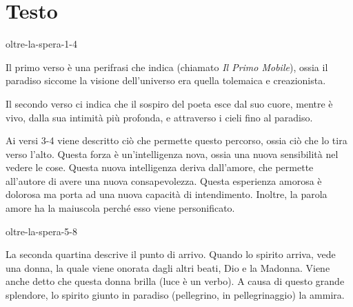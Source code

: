 \documentclass[preview]{standalone}
\begin{document}
\genpage

\section{Testo}


\begin{snippet}{oltre-la-spera-1-4}

    Il primo verso è una perifrasi che indica  (chiamato \textit{Il Primo Mobile}), ossia il paradiso
    siccome la visione dell'universo era quella tolemaica e creazionista.
    
    Il secondo verso ci indica che il sospiro del poeta esce dal suo cuore, mentre è vivo, dalla sua intimità più profonda,
    e attraverso i cieli fino al paradiso.  
    
    Ai versi 3-4 viene descritto ciò che permette questo percorso, ossia ciò che lo tira
    verso l'alto. Questa forza è un'intelligenza nova, ossia una nuova sensibilità nel vedere le cose.
    Questa nuova intelligenza deriva dall'amore, che permette all'autore di avere una nuova consapevolezza.
    Questa esperienza amorosa è dolorosa ma porta ad una nuova capacità di intendimento.
    Inoltre, la parola amore ha la maiuscola perché esso viene personificato.
\end{snippet}

\begin{snippet}{oltre-la-spera-5-8}

    La seconda quartina descrive il punto di arrivo.
    Quando lo spirito arriva, vede una donna, la quale viene onorata dagli altri beati, Dio e la Madonna.
    Viene anche detto che questa donna brilla (luce è un verbo).
    A causa di questo grande splendore, lo spirito giunto in paradiso (pellegrino, in pellegrinaggio) la ammira.
\end{snippet}
\end{document}
